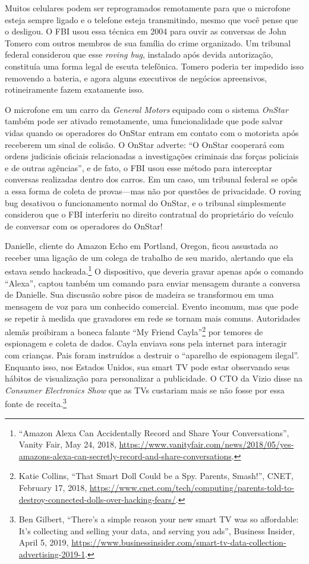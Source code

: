 \documentclass{book}
\newcommand{\ingles}[1]{\textit{#1}}
\begin{document}
Muitos celulares podem ser reprogramados remotamente para que o microfone
esteja sempre ligado e o telefone esteja transmitindo, mesmo que você pense que
o desligou. O FBI usou essa técnica em 2004 para ouvir as conversas de John
Tomero com outros membros de sua família do crime organizado. Um tribunal
federal considerou que esse \ingles{roving bug}, instalado após devida
autorização, constituía uma forma legal de escuta telefônica. Tomero poderia
ter impedido isso removendo a bateria, e agora alguns executivos de negócios
apreensivos, rotineiramente fazem exatamente isso.

O microfone em um carro da \ingles{General Motors} equipado com o sistema
\ingles{OnStar} também pode ser ativado remotamente, uma funcionalidade que
pode salvar vidas quando os operadores do OnStar entram em contato com o
motorista após receberem um sinal de colisão. O OnStar adverte: ``O OnStar
cooperará com ordens judiciais oficiais relacionadas a investigações criminais
das forças policiais e de outras agências'', e de fato, o FBI usou esse método
para interceptar conversas realizadas dentro dos carros. Em um caso, um
tribunal federal se opôs a essa forma de coleta de provas---mas não por
questões de privacidade. O roving bug desativou o funcionamento normal do
OnStar, e o tribunal simplesmente considerou que o FBI interferiu no direito
contratual do proprietário do veículo de conversar com os operadores do OnStar!

Danielle, cliente do Amazon Echo em Portland, Oregon, ficou assustada ao
receber uma ligação de um colega de trabalho de seu marido, alertando que ela
estava sendo hackeada.\footnote{``Amazon Alexa Can Accidentally Record and
Share Your Conversations'', Vanity Fair, May 24, 2018,
\url{https://www.vanityfair.com/news/2018/05/yes-amazons-alexa-can-secretly-record-and-share-conversations}.}
O dispositivo, que deveria gravar apenas após o comando ``Alexa'', captou
também um comando para enviar mensagem durante a conversa de Danielle. Sua
discussão sobre pisos de madeira se transformou em uma mensagem de voz para um
conhecido comercial. Evento incomum, mas que pode se repetir à medida que
gravadores em rede se tornam mais comuns. Autoridades alemãs proibiram a boneca
falante ``My Friend Cayla''\footnote{Katie Collins, ``That Smart Doll Could be
a Spy. Parents, Smash!'', CNET, February 17, 2018,
\url{https://www.cnet.com/tech/computing/parents-told-to-destroy-connected-dolls-over-hacking-fears/}.}
por temores de espionagem e coleta de dados. Cayla enviava sons pela internet
para interagir com crianças. Pais foram instruídos a destruir o ``aparelho de
espionagem ilegal''. Enquanto isso, nos Estados Unidos, sua smart TV pode estar
observando seus hábitos de visualização para personalizar a publicidade. O CTO
da Vizio disse na \ingles{Consumer Electronics Show} que as TVs custariam mais
se não fosse por essa fonte de receita.\footnote{ Ben Gilbert, ``There's a
simple reason your new smart TV was so affordable: It's collecting and selling
your data, and serving you ads'', Business Insider, April 5, 2019,
\url{https://www.businessinsider.com/smart-tv-data-collection-advertising-2019-1}.}
\end{document}
